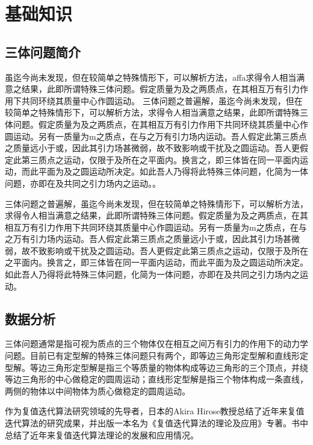 \documentclass{dmuthesis}
\begin{document}
\chapter{基础知识}

\section{三体问题简介}

虽迄今尚未发现，但在较简单之特殊情形下，可以解析方法，af\/fa求得令人相当满意之结果，此即所谓特殊三体问题。假定质量为及之两质点，在其相互万有引力作用下共同环绕其质量中心作圆运动。
三体问题之普遍解，虽迄今尚未发现，但在较简单之特殊情形下，可以解析方法，求得令人相当满意之结果，此即所谓特殊三体问题。假定质量为及之两质点，在其相互万有引力作用下共同环绕其质量中心作圆运动。另有一质量为m之质点，在与之万有引力场内运动。吾人假定此第三质点之质量远小于或，因此其引力场甚微弱，故不致影响或干扰及之圆运动。吾人更假定此第三质点之运动，仅限于及所在之平面内。换言之，即三体皆在同一平面内运动，而此平面为及之圆运动所决定。如此吾人乃得将此特殊三体问题，化简为一体问题，亦即在及共同之引力场内之运动。。

三体问题之普遍解，虽迄今尚未发现，但在较简单之特殊情形下，可以解析方法，求得令人相当满意之结果，此即所谓特殊三体问题。假定质量为及之两质点，在其相互万有引力作用下共同环绕其质量中心作圆运动。另有一质量为m之质点，在与之万有引力场内运动。吾人假定此第三质点之质量远小于或，因此其引力场甚微弱，故不致影响或干扰及之圆运动。吾人更假定此第三质点之运动，仅限于及所在之平面内。换言之，即三体皆在同一平面内运动，而此平面为及之圆运动所决定。如此吾人乃得将此特殊三体问题，化简为一体问题，亦即在及共同之引力场内之运动。

\section{数据分析}

三体问题通常是指可视为质点的三个物体仅在相互之间万有引力的作用下的动力学问题。目前已有定型解的特殊三体问题只有两个，即等边三角形定型解和直线形定型解。等边三角形定型解是指三个等质量的物体构成等边三角形的三个顶点，并绕等边三角形的中心做稳定的圆周运动；直线形定型解是指三个物体构成一条直线，两侧的物体以中间物体为质心做稳定的圆周运动。

作为复值迭代算法研究领域的先导者，日本的Akira Hirose教授总结了近年来复值迭代算法的研究成果，并出版一本名为《复值迭代算法的理论及应用》专著。书中总结了近年来复值迭代算法理论的发展和应用情况。
\end{document}
